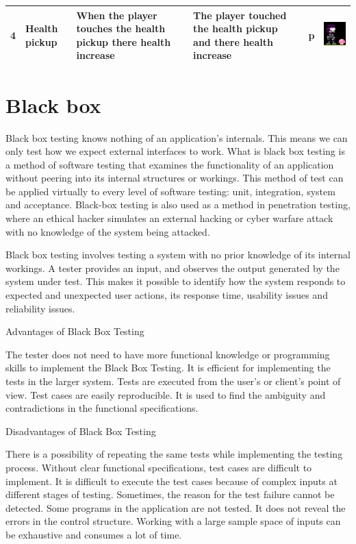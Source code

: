 \documentclass{article}
\begin{document}
\begin{center}
\begin{tabular}{|m{1em}|m{3em}|m{20em}|m{5em}|m{1.25em}|m{10em}|}
	\hline
		4 & Health pickup  & When the player touches the health pickup there health increase & The player touched the health pickup and there health increase & p & \includegraphics[scale=0.75]{health 1} \\
	\hline
\end{tabular}
\end{center}

\section{Black box}
Black box testing knows nothing of an application’s internals. This means we can only test how we expect external interfaces to work. What is black box testing is a method of software testing that examines the functionality of an application without peering into its internal structures or workings. This method of test can be applied virtually to every level of software testing: unit, integration, system and acceptance. Black-box testing is also used as a method in penetration testing, where an ethical hacker simulates an external hacking or cyber warfare attack with no knowledge of the system being attacked. 

Black box testing involves testing a system with no prior knowledge of its internal workings. A tester provides an input, and observes the output generated by the system under test. This makes it possible to identify how the system responds to expected and unexpected user actions, its response time, usability issues and reliability issues.

Advantages of Black Box Testing

The tester does not need to have more functional knowledge or programming skills to implement the Black Box Testing.
It is efficient for implementing the tests in the larger system.
Tests are executed from the user’s or client’s point of view.
Test cases are easily reproducible.
It is used to find the ambiguity and contradictions in the functional specifications.

Disadvantages of Black Box Testing

There is a possibility of repeating the same tests while implementing the testing process.
Without clear functional specifications, test cases are difficult to implement.
It is difficult to execute the test cases because of complex inputs at different stages of testing.
Sometimes, the reason for the test failure cannot be detected.
Some programs in the application are not tested.
It does not reveal the errors in the control structure.
Working with a large sample space of inputs can be exhaustive and consumes a lot of time.
\end{document}
